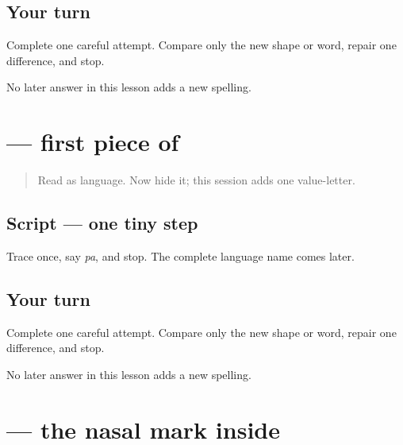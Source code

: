 \subsection*{Your turn}
Complete one careful attempt. Compare only the new shape or word, repair one difference, and stop.

\begin{tcolorbox}[breakable,colback=teal!4,colframe=teal!35!black,title={Before you move on}]
No later answer in this lesson adds a new spelling.
\end{tcolorbox}
\section[\texorpdfstring{\pa{ਪ} (pa)}{ਪ (pa)}]{ — first piece of }

\label{lesson:PA-W03-pa}



\begin{quote}
Read \textbf{} as language. Now hide it; this session adds one value-letter.
\end{quote}

\subsection*{Script — one tiny step}

Trace \textbf{} once, say \emph{pa}, and stop. The complete language name comes later.

\subsection*{Your turn}
Complete one careful attempt. Compare only the new shape or word, repair one difference, and stop.

\begin{tcolorbox}[breakable,colback=teal!4,colframe=teal!35!black,title={Before you move on}]
No later answer in this lesson adds a new spelling.
\end{tcolorbox}
\section[\texorpdfstring{\pa{ੰ} (tippi)}{ੰ (tippi)}]{ — the nasal mark inside }

\label{lesson:PA-W03-tippi}



